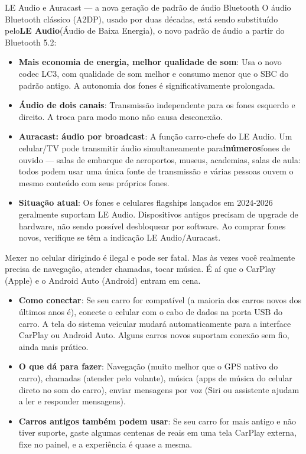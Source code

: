 \begin{tcbinfo}{LE Audio e Auracast — a nova geração de padrão de áudio Bluetooth}
O áudio Bluetooth clássico (A2DP), usado por duas décadas, está sendo substituído pelo\textbf{LE Audio}(Áudio de Baixa Energia), o novo padrão de áudio a partir do Bluetooth 5.2:

\begin{itemize}
  \item \textbf{Mais economia de energia, melhor qualidade de som}: Usa o novo codec LC3, com qualidade de som melhor e consumo menor que o SBC do padrão antigo. A autonomia dos fones é significativamente prolongada.
  \item \textbf{Áudio de dois canais}: Transmissão independente para os fones esquerdo e direito. A troca para modo mono não causa desconexão.
  \item \textbf{Auracast: áudio por broadcast}: A função carro-chefe do LE Audio. Um celular/TV pode transmitir áudio simultaneamente para\textbf{inúmeros}fones de ouvido — salas de embarque de aeroportos, museus, academias, salas de aula: todos podem usar uma única fonte de transmissão e várias pessoas ouvem o mesmo conteúdo com seus próprios fones.
  \item \textbf{Situação atual}: Os fones e celulares flagships lançados em 2024-2026 geralmente suportam LE Audio. Dispositivos antigos precisam de upgrade de hardware, não sendo possível desbloquear por software. Ao comprar fones novos, verifique se têm a indicação LE Audio/Auracast.
\end{itemize}

\end{tcbinfo}


Mexer no celular dirigindo é ilegal e pode ser fatal. Mas às vezes você realmente precisa de navegação, atender chamadas, tocar música. É aí que o CarPlay (Apple) e o Android Auto (Android) entram em cena.

\begin{itemize}
  \item \textbf{Como conectar}: Se seu carro for compatível (a maioria dos carros novos dos últimos anos é), conecte o celular com o cabo de dados na porta USB do carro. A tela do sistema veicular mudará automaticamente para a interface CarPlay ou Android Auto. Alguns carros novos suportam conexão sem fio, ainda mais prático.
  \item \textbf{O que dá para fazer}: Navegação (muito melhor que o GPS nativo do carro), chamadas (atender pelo volante), música (apps de música do celular direto no som do carro), enviar mensagens por voz (Siri ou assistente ajudam a ler e responder mensagens).
  \item \textbf{Carros antigos também podem usar}: Se seu carro for mais antigo e não tiver suporte, gaste algumas centenas de reais em uma tela CarPlay externa, fixe no painel, e a experiência é quase a mesma.
\end{itemize}

